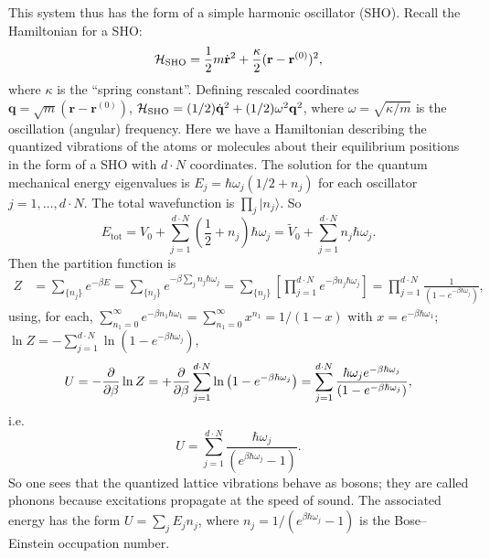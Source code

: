 This system thus has the form of a simple harmonic oscillator (SHO). Recall the Hamiltonian for a SHO:
\begin{equation}
  \mathcal{H}_{\text{SHO}} = \frac{1}{2}m\dot{\mathbf r}^2 + \frac{\kappa}{2}(\mathbf r-\mathbf r^{(0)})^2,
\end{equation}
where $\kappa$ is the ``spring constant''. Defining rescaled coordinates $\mathbf q = \sqrt m(\mathbf r-\mathbf r^{(0)})$,
$\mathcal{H}_{\text{SHO}} = (1/2)\dot{\mathbf q}^2 + (1/2)\omega^2\mathbf q^2$, where $\omega = \sqrt{\kappa/m}$ is the oscillation (angular)
frequency. Here we have a Hamiltonian describing the quantized vibrations of the atoms or molecules about their equilibrium positions in
the form of a SHO with $d\cdot N$ coordinates. The solution for the quantum mechanical energy eigenvalues is
$E_j = \hbar\omega_j(1/2+n_j)$ for each oscillator $j = 1,\ldots,d\cdot N$. The total wavefunction is $\prod_j|n_j\rangle$. So
\begin{equation}
  E_{\text{tot}} = V_0 + \sum_{j=1}^{d\cdot N}\left(\frac{1}{2}+n_j\right)\hbar\omega_j = \tilde V_0 + \sum_{j=1}^{d\cdot N}n_j\hbar\omega_j .
\end{equation}
Then the partition function is
\begin{align}
  Z &= \sum_{\{n_j\}}e^{-\beta E} = \sum_{\{n_j\}}e^{-\beta\sum_jn_j\hbar\omega_j}
     = \sum_{\{n_j\}}\left[\prod_{j=1}^{d\cdot N}e^{-\beta n_j\hbar\omega_j}\right]
     = \prod_{j=1}^{d\cdot N}\frac{1}{(1-e^{-\beta\hbar\omega_j})},
\end{align}
using, for each, $\sum_{n_1=0}^\infty e^{-\beta n_1\hbar\omega_1} = \sum_{n_1=0}^\infty x^{n_1} = 1/(1-x)$ with
$x = e^{-\beta\hbar\omega_1}$; $\ln Z = -\sum_{j=1}^{d\cdot N}\ln(1-e^{-\beta\hbar\omega_j})$,
\begin{equation}
  U = -\frac{\partial }{\partial \beta}\ln Z = +\frac{\partial }{\partial \beta}\sum_{j=1}^{d\cdot N}\ln\left(1-e^{-\beta\hbar\omega_j}\right)
    = \sum_{j=1}^{d\cdot N}\frac{\hbar\omega_je^{-\beta\hbar\omega_j}}{(1-e^{-\beta\hbar\omega_j})},
\end{equation}
i.e.
\begin{equation}
  U = \sum_{j=1}^{d\cdot N}\frac{\hbar\omega_j}{(e^{\beta\hbar\omega_j}-1)}.
\end{equation}
So one sees that the quantized lattice vibrations behave as bosons; they are called phonons because excitations propagate at the speed
of sound. The associated energy has the form $U = \sum_jE_jn_j$, where $n_j = 1/(e^{\beta\hbar\omega_j}-1)$ is the
Bose--Einstein occupation number.

